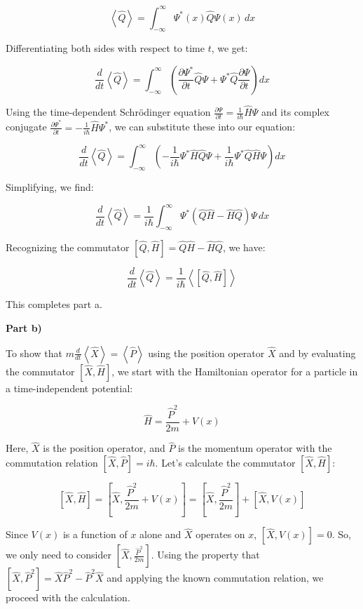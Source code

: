 \[
\left<\hat{Q}\right> = \int_{-\infty}^{\infty} \Psi^{*}(x) \hat{Q} \Psi(x) \, dx
\]

Differentiating both sides with respect to time \(t\), we get:

\[
\frac{d}{dt}\left<\hat{Q}\right> = \int_{-\infty}^{\infty} \left( \frac{\partial \Psi^{*}}{\partial t} \hat{Q} \Psi + \Psi^{*} \hat{Q} \frac{\partial \Psi}{\partial t} \right) dx
\]

Using the time-dependent Schrödinger equation \(\frac{\partial\Psi}{\partial t} = \frac{1}{i\hbar}\hat{H}\Psi\) and its complex conjugate \(\frac{\partial\Psi^{*}}{\partial t} = -\frac{1}{i\hbar}\hat{H}\Psi^{*}\), we can substitute these into our equation:

\[
\frac{d}{dt}\left<\hat{Q}\right> = \int_{-\infty}^{\infty} \left( -\frac{1}{i\hbar} \Psi^{*} \hat{H} \hat{Q} \Psi + \frac{1}{i\hbar} \Psi^{*} \hat{Q} \hat{H} \Psi \right) dx
\]

Simplifying, we find:

\[
\frac{d}{dt}\left<\hat{Q}\right> = \frac{1}{i\hbar} \int_{-\infty}^{\infty} \Psi^{*} \left( \hat{Q} \hat{H} - \hat{H} \hat{Q} \right) \Psi \, dx
\]

Recognizing the commutator \(\left[ \hat{Q}, \hat{H} \right] = \hat{Q} \hat{H} - \hat{H} \hat{Q}\), we have:

\[
\frac{d}{dt}\left<\hat{Q}\right> = \frac{1}{i\hbar}\left< \left[ \hat{Q}, \hat{H} \right] \right>
\]

This completes part a.

\textbf{Part b)}

To show that \(m\frac{d}{dt}\left<\hat{X}\right> = \left<\hat{P}\right>\) using the position operator \(\hat{X}\) and by evaluating the commutator \(\left[ \hat{X}, \hat{H}\right]\), we start with the Hamiltonian operator for a particle in a time-independent potential:

\[
\hat{H} = \frac{\hat{P}^2}{2m} + V(x)
\]

Here, \(\hat{X}\) is the position operator, and \(\hat{P}\) is the momentum operator with the commutation relation \(\left[\hat{X}, \hat{P}\right] = i\hbar\). Let's calculate the commutator \(\left[ \hat{X}, \hat{H}\right]\):

\[
\left[ \hat{X}, \hat{H}\right] = \left[ \hat{X}, \frac{\hat{P}^2}{2m} + V(x)\right] = \left[ \hat{X}, \frac{\hat{P}^2}{2m}\right] + \left[ \hat{X}, V(x)\right]
\]

Since \(V(x)\) is a function of \(x\) alone and \(\hat{X}\) operates on \(x\), \(\left[ \hat{X}, V(x)\right] = 0\). So, we only need to consider \(\left[ \hat{X}, \frac{\hat{P}^2}{2m}\right]\). Using the property that \(\left[\hat{X}, \hat{P}^2\right] = \hat{X}\hat{P}^2 - \hat{P}^2\hat{X}\) and applying the known commutation relation, we proceed with the calculation.


